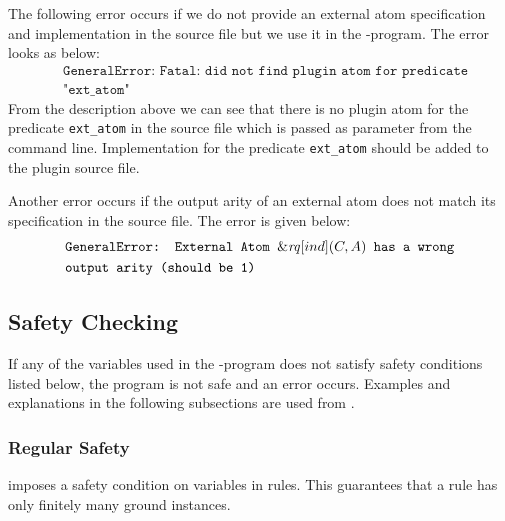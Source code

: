 \documentclass[a4paper, titlepage]{article}
\newcommand{\ext}[3]{\ensuremath{\&{\mathit{#1}}[#2](#3)}}
\begin{document}
The following error occurs if we do not provide an external atom specification and implementation 
in the source file but we use it in the \hex{}-program. The error looks as below:
\begin{align*}
& \texttt{GeneralError: Fatal: did not find plugin atom for predicate}\\ 
& \texttt{"ext\_atom"}
\end{align*}  
From the description above we can see that there is no plugin atom for the predicate \texttt{ext\_atom}
in the source file which is passed as parameter from the command line. Implementation for the predicate 
\texttt{ext\_atom} should be added to the plugin source file.

Another error occurs if the output arity of an external atom does not 
match its specification in the source file. The error is given below:
\begin{align*}
& \texttt{GeneralError: External Atom \ext{rq}{ind}{C,A} has a wrong} \\
& \texttt{output arity (should be 1)}
\end{align*}  

\subsection{Safety Checking}
\label{safetyCheck}
If any of the variables used in the \hex{}-program does not satisfy safety conditions listed below, the program is not safe and an error occurs. Examples and explanations in the following subsections are used from \cite{brfwilvpg2009}. 

\subsubsection{Regular Safety}
\dlvhex{} imposes a safety condition on variables in rules. 
This guarantees that a rule has only finitely many ground instances.
\end{document}
